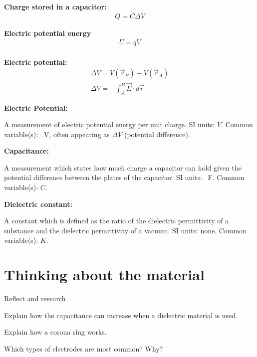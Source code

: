 \newpage
\begin{importantEquations}
\medskip
\begin{multicols}{2}
\textbf{Charge stored in a capacitor:}
\begin{align*}
Q = C\Delta V
\end{align*}

\textbf{Electric potential energy}
\begin{align*}
U=qV
\end{align*}
\columnbreak
\\
\textbf{Electric potential:}
\begin{align*}
\Delta V = V(\vec r_B)-V(\vec r_A)\\
\Delta V = -\int_{A}^{B}\vec E \cdot d\vec r
\end{align*}
\medskip
\end{multicols}
\end{importantEquations}

\begin{definitions}
	\textbf{Electric Potential:}
	\item A measurement of electric potential energy per unit charge. SI units: $V$. Common variable(s): \SI{}{V}, often appearing as $\Delta V$ (potential difference).
	\medskip
	\item \textbf{Capacitance:}
	\item A measurement which states how much charge a capacitor can hold given the potential difference between the plates of the capacitor. SI units: \SI{}{F}. Common variable(s): $C$.
	\medskip
	\item \textbf{Dielectric constant:}
	\item A constant which is defined as the ratio of the dielectric permittivity of a substance and the dielectric permittivity of a vacuum. SI units: none. Common variable(s): $K$.
\end{definitions}

\newpage
\section{Thinking about the material}

\begin{chapteractivity}{Reflect and research}
{
\item Explain how the capacitance can increase when a dielectric material is used.
\item Explain how a corona ring works.
\item Which types of electrodes are most common? Why?
}
\end{chapteractivity}

